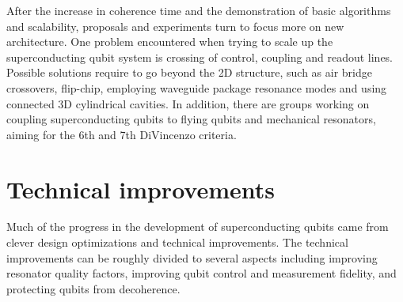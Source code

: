 After the increase in coherence time and the demonstration of basic algorithms and scalability, proposals and experiments turn to focus more on new architecture. One problem encountered when trying to scale up the superconducting qubit system is crossing of control, coupling and readout lines. Possible solutions require to go beyond the 2D structure, such as air bridge crossovers\cite{Versluis2016}, flip-chip\cite{Yorozu2006}, employing waveguide package resonance modes\cite{Minev2016} and using connected 3D cylindrical cavities\cite{Axline2016}. In addition, there are groups working on coupling superconducting qubits to flying qubits and mechanical resonators\cite{Palomaki2013,Reed2017,Keller2017}, aiming for the 6th and 7th DiVincenzo criteria.




\section{Technical improvements} %
\label{sec:technical_improvements}

Much of the progress in the development of superconducting qubits came from clever design optimizations and technical improvements. The technical improvements can be roughly divided to several aspects including improving resonator quality factors, improving qubit control and measurement fidelity, and protecting qubits from decoherence.


